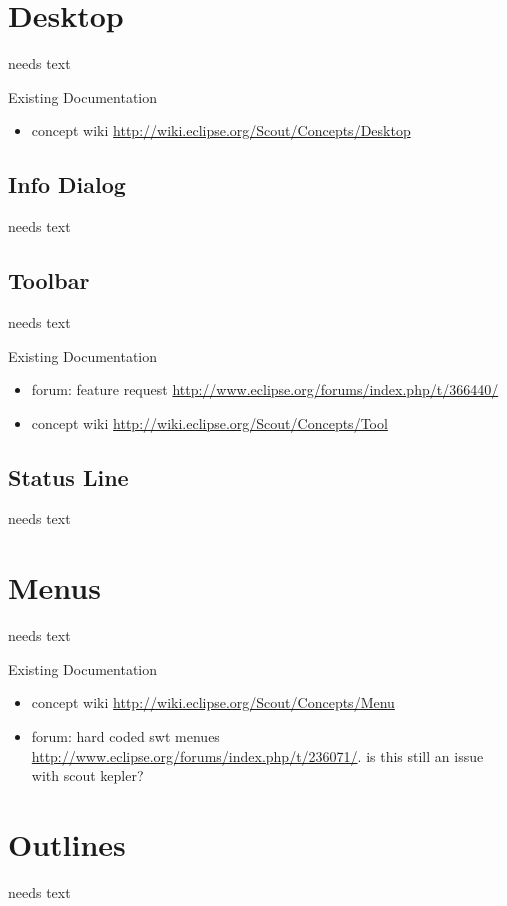 \documentclass[a4paper,10pt,twoside]{book}
\begin{document}
\section{Desktop}
needs text

\noindent Existing Documentation
\begin{itemize}
  \item concept wiki \url{http://wiki.eclipse.org/Scout/Concepts/Desktop}
\end{itemize}

\subsection{Info Dialog}
needs text

\subsection{Toolbar}
needs text

\noindent Existing Documentation
\begin{itemize}
  \item forum: feature request \url{http://www.eclipse.org/forums/index.php/t/366440/}
  \item concept wiki \url{http://wiki.eclipse.org/Scout/Concepts/Tool}
\end{itemize}

\subsection{Status Line}
needs text

\section{Menus}
needs text

\noindent Existing Documentation
\begin{itemize}
  \item concept wiki \url{http://wiki.eclipse.org/Scout/Concepts/Menu}
  \item forum: hard coded swt menues \url{http://www.eclipse.org/forums/index.php/t/236071/}. is this still an issue with scout kepler?
\end{itemize}

\section{Outlines}
needs text
\end{document}
